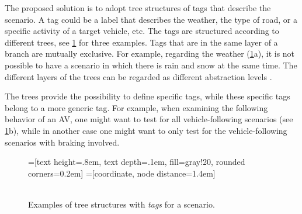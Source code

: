 The proposed solution is to adopt tree structures of tags that describe the scenario. A tag could be a label that describes the weather, the type of road, or a specific activity of a target vehicle, etc. The tags are structured according to different trees, see \cref{fig:tag trees} for three examples. Tags that are in the same layer of a branch are mutually exclusive. For example, regarding the weather (\cref{fig:tag trees}a), it is not possible to have a scenario in which there is rain and snow at the same time. The different layers of the trees can be regarded as different abstraction levels \cite{Bonnin2014}. 

The trees provide the possibility to define specific tags, while these specific tags belong to a more generic tag. For example, when examining the following behavior of an AV, one might want to test for all vehicle-following scenarios (see \cref{fig:tag trees}b), while in another case one might want to only test for the vehicle-following scenarios with braking involved.


\begin{figure}
	\centering
	=[text height=.8em, text depth=.1em, fill=gray!20, rounded corners=0.2em]
	=[coordinate, node distance=1.4em]
	 \\
	\\
	\caption{Examples of tree structures with \emph{tags} for a scenario.}
	\label{fig:tag trees}
	\spaceaftercaption
\end{figure}
